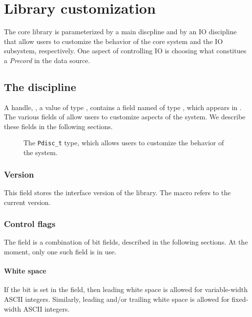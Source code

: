 \chapter{Library customization}
\label{chap:library-customization}
The \pads{} core library is parameterized by a main discpline and by
an IO discipline that allow users to customize the behavior of the
core system and the IO subsystem, respectively.  One aspect of
controlling IO is choosing what constitues a \textit{Precord} in the
data source.

\section{The \pads{} discipline}
A \pads{} handle, \ie{}, a value of type , contains a field
named  of type , which appears in
. The various fields of  allow users to
customize aspects of the \pads{} system.  We describe these fields in
the following sections.

\begin{figure}
\caption{The \texttt{Pdisc\_t} type, which allows users to customize the
  behavior of the \pads{} system.}
\label{fig:pdisc}
\end{figure}

\subsection{Version}
\label{sec:library-customization-version}
This field stores the interface version of the \pads{} library.
The \C{} macro  refers to the current version.

\subsection{Control flags}
\label{sec:library-customization-control-flags}
The  field is a combination of bit fields, described in the
following sections.  At the moment, only one such field is in use.

\subsubsection{White space}
\label{sec:library-customization-white-space}
If the  bit is set in the  field, 
then leading white space is allowed for variable-width ASCII
integers.  Similarly, leading and/or trailing white space is allowed
for fixed-width ASCII integers.

